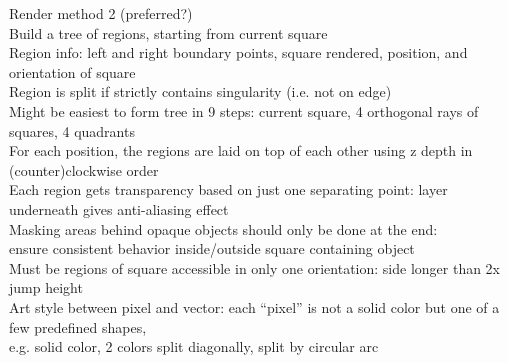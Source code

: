 \documentclass{article}
\begin{document}
Render method 2 (preferred?) \\
Build a tree of regions, starting from current square \\
Region info: left and right boundary points, square rendered,
position, and orientation of square \\
Region is split if strictly contains singularity (i.e. not on edge) \\
Might be easiest to form tree in 9 steps:
current square, 4 orthogonal rays of squares, 4 quadrants \\
For each position, the regions are laid on top of each other using z depth
in (counter)clockwise order \\
Each region gets transparency based on just one separating point:
layer underneath gives anti-aliasing effect \\
Masking areas behind opaque objects should only be done at the end: \\
ensure consistent behavior inside/outside square containing object \\

Must be regions of square accessible in only one orientation:
side longer than 2x jump height \\

Art style between pixel and vector:
each ``pixel'' is not a solid color but one of a few predefined shapes, \\
e.g. solid color, 2 colors split diagonally, split by circular arc \\
\end{document}
